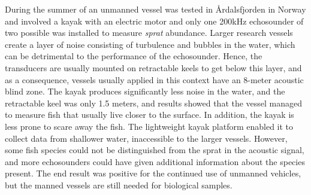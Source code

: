          During the summer of \citeyear{johnsen2020measuring} an unmanned vessel was tested in Årdalsfjorden in Norway and involved a kayak with an electric motor and only one 200kHz echosounder of two possible was installed to measure \textit{sprat} abundance\cite{johnsen2020measuring}. Larger research vessels create a layer of noise consisting of turbulence and bubbles in the water, which can be detrimental to the performance of the echosounder\cite{korneliussen2008proposals}. Hence, the transducers are usually mounted on retractable keels to get below this layer, and as a consequence, vessels usually applied in this context have an 8-meter acoustic  blind zone. The kayak produces significantly less noise in the water, and the retractable keel was only 1.5 meters, and results showed that the vessel managed to measure fish that usually live closer to the surface. In addition, the kayak is less prone to scare away the fish. The lightweight kayak platform enabled it to collect data from shallower water, inaccessible to the larger vessels. However, some fish species could not be distinguished from the sprat in the acoustic signal, and more echosounders could have given additional information about the species present\cite{korneliussen2008proposals}. The end result was positive for the continued use of unmanned vehicles, but the manned vessels are still needed for biological samples\cite{johnsen2020measuring}.



    

    
    
    


